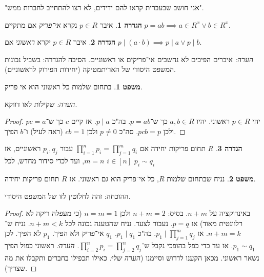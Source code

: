 \documentclass[a4paper]{article}
\theoremstyle{definition}
\newtheorem{Theorem}{משפט}
\newtheorem{definition}{הגדרה}
\newcommand\theo  [1] {\begin{Theorem}#1\end{Theorem}}
\newcommand\defi  [1] {\begin{definition}#1\end{definition}}
\begin{document}
	"אני חושב שבעברית קראו להם ידידים, לא רצו להתחייב לחברות ממש". 
	
	
	\defi{איבר $p \in R$ נקרא \textit{אי־פריק} אם מתקיים $p = ab \implies a \in R^x \lor b \in R^x$. }
	
	\defi{איבר $p \in R$ יקרא \textit{ראשוני} אם $p \mid (a \cdot b) \implies p \mid a \lor p \mid b$. }
	\textit{הערה: }איברים הפיכים לא נחשבים אי־פריקים או ראשוניים. הסיבה להגדרה: בשביל נכונות המשפט היסודי של האריתמטיקה (יחידות הפירוק לראשוניים). 
	
	\theo{בתחום שלמות כל ראשוני הוא אי פריק. }
	\textit{הערה: }שקילות לאו דווקא. 
	\begin{proof}
		יהי $p \in R$ ראשוני. יהיו $a, b \in R$ כך ש־$p = ab$. בה"כ $p \mid a$. אז קיים $c$ כך ש־$pc = a$ ולכן $pcb = p$. סה"כ $p \neq 0$ ולכן $cb = 1$ (ראה לעיל) ו־$b$ הפיך. 
	\end{proof}
	\defi{$R$ תחום פריקות יחידה אם $\prod_{i = 1}^{n}p_i = \prod_{j = 1}^{m}q_i$ עבור $p_i, q_j$ ראשוניים, אז $m = n$, ועד לכדי סידור מחדש, לכל $i \in [n]$ $p_i \sim q_i$}
	\theo{נניח שבתחום שלמות $R$, כל אי־פריק הוא גם ראשוני. אז $R$ תחום פריקות יחידה. }
	
	ההוכחה: זהה לחלוטין לזו של המשפט היסודי. \begin{proof}
		באינדוקציה על $n+m$. בסיס: $n + m = 2$ ולכן $n = m = 1$ (כי מעפלה ריקה לא רלוונטית מאוד) אז $p = q$. נעבור לצעד. נניח שהטענה נכונה לכל $n + m < k$. נניח ש־$n + m = k$. אז $p_1 \mid \prod_{j = 1}^{m}q_j$. בה"כ $p_1 \mid q_1$. $q_1$ אי־פריק ולא הפיך. $p_1$ לא הפיך. לכן $p_1 \sim q_1$. אז עד כדי כפל בהופכי נקבל ש־$\prod_{i = 2}^{n} p_i = \prod_{j = 2}^{n} q_j$. \textit{הערה: }ראשוני כפול הפיך נשאר ראשוני. מכאן הקענו לדרוש וסיימנו (\textit{הערה שלי: }כאילו תכפילו בחברים ותקבלו את מה שצריך). 
	\end{proof}
	
\end{document}
